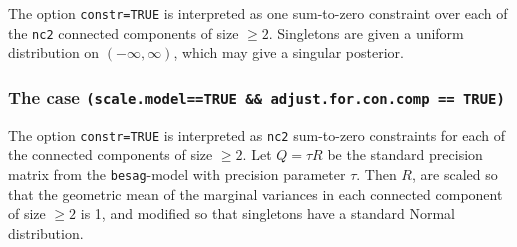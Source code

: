 The option \texttt{constr=TRUE} is interpreted as one sum-to-zero
constraint over each of the \texttt{nc2} connected components of size
$\ge2$. Singletons are given a uniform distribution on
$(-\infty,\infty)$, which may give a singular posterior.

\subsubsection*{The case \texttt{(scale.model==TRUE \&\&
        adjust.for.con.comp == TRUE)}}

The option \texttt{constr=TRUE} is interpreted as \texttt{nc2}
sum-to-zero constraints for each of the connected components of size
$\ge2$. Let $Q = \tau R$ be the standard precision matrix from the
\texttt{besag}-model with precision parameter $\tau$. Then $R$, are
scaled so that the geometric mean of the marginal variances in each
connected component of size $\ge2$ is 1, and modified so that
singletons have a standard Normal distribution.

